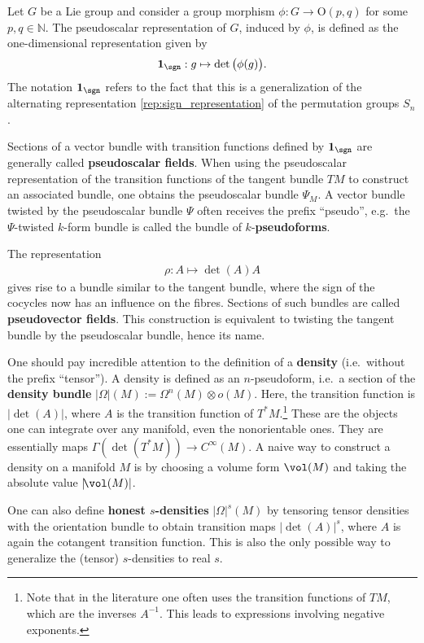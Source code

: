     \begin{example}[Pseudoscalars]
        Let $G$ be a Lie group and consider a group morphism $\phi:G\rightarrow\mathrm{O}(p,q)$ for some $p,q\in\mathbb{N}$. The pseudoscalar representation of $G$, induced by $\phi$, is defined as the one-dimensional representation given by
        \begin{gather}
            \mathbf{1}_{\sgn}:g\mapsto\det\big(\phi(g)\big).
        \end{gather}
        The notation $\mathbf{1}_{\sgn}$ refers to the fact that this is a generalization of the alternating representation \ref{rep:sign_representation} of the permutation groups $S_n$.

        Sections of a vector bundle with transition functions defined by $\mathbf{1}_{\sgn}$ are generally called \textbf{pseudoscalar fields}. When using the pseudoscalar representation of the transition functions of the tangent bundle $TM$ to construct an associated bundle, one obtains the pseudoscalar bundle $\Psi_M$. A vector bundle twisted by the pseudoscalar bundle $\Psi$ often receives the prefix ``pseudo'', e.g.~the $\Psi$-twisted $k$-form bundle is called the bundle of $k$-\textbf{pseudoforms}.
    \end{example}
    \begin{example}[Pseudovectors]
        The representation
        \begin{gather}
            \rho:A\mapsto\det(A)A
        \end{gather}
        gives rise to a bundle similar to the tangent bundle, where the sign of the cocycles now has an influence on the fibres. Sections of such bundles are called \textbf{pseudovector fields}. This construction is equivalent to twisting the tangent bundle by the pseudoscalar bundle, hence its name.
    \end{example}

    \begin{remark}\label{bundle:honest_density}
        One should pay incredible attention to the definition of a \textbf{density} (i.e.~without the prefix ``tensor''). A density is defined as an $n$-pseudoform, i.e.~a section of the \textbf{density bundle} $|\Omega|(M):=\Omega^n(M)\otimes o(M)$. Here, the transition function is $|\!\det(A)|$, where $A$ is the transition function of $T^*M$.\footnote{Note that in the literature one often uses the transition functions of $TM$, which are the inverses $A^{-1}$. This leads to expressions involving negative exponents.} These are the objects one can integrate over any manifold, even the nonorientable ones. They are essentially maps $\Gamma(\det(T^*M))\rightarrow C^\infty(M)$. A naive way to construct a density on a manifold $M$ is by choosing a volume form $\vol(M)$ and taking the absolute value $|\!\vol(M)|$.

        One can also define \textbf{honest $s$-densities} $|\Omega|^s(M)$ by tensoring tensor densities with the orientation bundle to obtain transition maps $|\!\det(A)|^s$, where $A$ is again the cotangent transition function. This is also the only possible way to generalize the (tensor) $s$-densities to real $s$.
    \end{remark}

